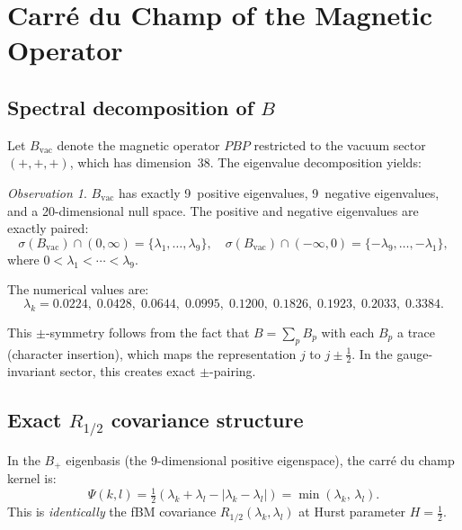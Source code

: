 \documentclass[11pt,a4paper]{article}
\theoremstyle{plain}
\theoremstyle{definition}
\theoremstyle{remark}
\newtheorem{observation}[theorem]{Observation}
\begin{document}
\section{Carr\'{e} du Champ of the Magnetic Operator}\label{sec:carre}

\subsection{Spectral decomposition of $B$}

Let $B_{\text{vac}}$ denote the magnetic operator $PBP$ restricted to
the vacuum sector $(+,+,+)$, which has dimension~38.  The eigenvalue
decomposition yields:

\begin{observation}\label{obs:pm}
$B_{\mathrm{vac}}$ has exactly 9~positive eigenvalues, 9~negative
eigenvalues, and a 20-dimensional null space.  The positive and
negative eigenvalues are exactly paired:
\begin{equation}
  \sigma(B_{\mathrm{vac}}) \cap (0,\infty) = \{\lambda_1, \ldots, \lambda_9\},
  \quad
  \sigma(B_{\mathrm{vac}}) \cap (-\infty,0) = \{-\lambda_9, \ldots, -\lambda_1\},
\end{equation}
where $0 < \lambda_1 < \cdots < \lambda_9$.
\end{observation}

The numerical values are:
\begin{equation*}
  \lambda_k = 0.0224,\; 0.0428,\; 0.0644,\; 0.0995,\; 0.1200,\;
  0.1826,\; 0.1923,\; 0.2033,\; 0.3384.
\end{equation*}

This $\pm$-symmetry follows from the fact that $B = \sum_p B_p$ with
each $B_p$ a trace (character insertion), which maps the representation
$j$ to $j \pm \tfrac{1}{2}$.  In the gauge-invariant sector, this
creates exact $\pm$-pairing.

\subsection{Exact $R_{1/2}$ covariance structure}

In the $B_+$ eigenbasis (the 9-dimensional positive eigenspace), the
carr\'{e} du champ kernel is:
\begin{equation}\label{eq:psi-YM}
  \Psi(k,l) = \tfrac{1}{2}(\lambda_k + \lambda_l - |\lambda_k - \lambda_l|)
  = \min(\lambda_k,\,\lambda_l).
\end{equation}
This is \emph{identically} the fBM covariance $R_{1/2}(\lambda_k,
\lambda_l)$ at Hurst parameter $H = \tfrac{1}{2}$.
\end{document}
